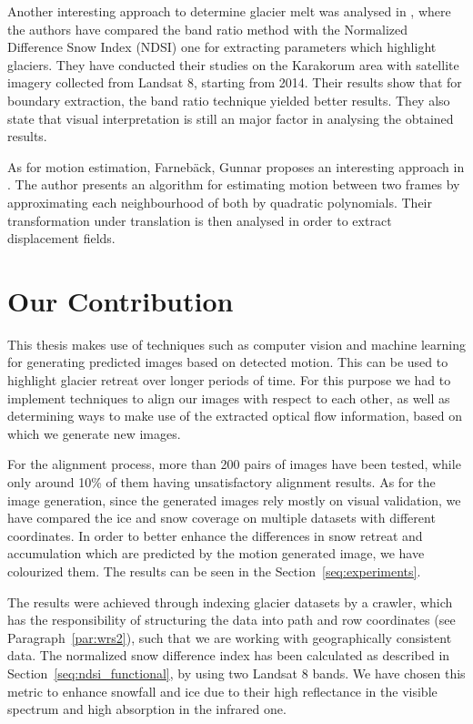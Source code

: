 \documentclass[12pt, a4paper]{report}
\begin{document}
	\par Another interesting approach to determine glacier melt was analysed in \cite{WANG2017}, where the authors have compared the band ratio method with the Normalized Difference Snow Index (NDSI) one for extracting parameters which highlight glaciers. They have conducted their studies on the Karakorum area with satellite imagery collected from Landsat 8, starting from 2014. Their results show that for boundary extraction, the band ratio technique yielded better results. They also state that visual interpretation is still an major factor in analysing the obtained results.
	
	\par As for motion estimation, Farneb{\"a}ck, Gunnar proposes an interesting approach in \cite{GUNNAR2003}. The author presents an algorithm for estimating motion between two frames by approximating each neighbourhood of both by quadratic polynomials. Their transformation under translation is then analysed in order to extract displacement fields.

	\section{Our Contribution}
	
	\par This thesis makes use of techniques such as computer vision and machine learning for generating predicted images based on detected motion. This can be used to highlight glacier retreat over longer periods of time. For this purpose we had to implement techniques to align our images with respect to each other, as well as determining ways to make use of the extracted optical flow information, based on which we generate new images.

	\par For the alignment process, more than 200 pairs of images have been tested, while only around 10\% of them having unsatisfactory alignment results. As for the image generation, since the generated images rely mostly on visual validation, we have compared the ice and snow coverage on multiple datasets with different coordinates. In order to better enhance the differences in snow retreat and accumulation which are predicted by the motion generated image, we have colourized them. The results can be seen in the Section~\ref{seq:experiments}. 
	
	\par The results were achieved through indexing glacier datasets by a crawler, which has the responsibility of structuring the data into path and row coordinates (see Paragraph~\ref{par:wrs2}), such that we are working with geographically consistent data. The normalized snow difference index has been calculated as described in Section~\ref{seq:ndsi_functional}, by using two Landsat 8 bands. We have chosen this metric to enhance snowfall and ice due to their high reflectance in the visible spectrum and high absorption in the infrared one.
	
\end{document}
